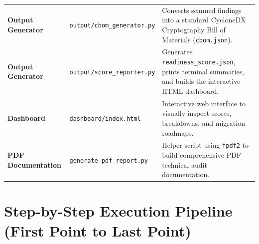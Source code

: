 \documentclass[11pt,a4paper,landscape]{article}
\begin{document}
{\begin{tabularx}{\linewidth}{l l X}
\textbf{Output Generator} & \texttt{output/cbom_generator.py} & Converts scanned findings into a standard CycloneDX Cryptography Bill of Materials (\texttt{cbom.json}). \\
\textbf{Output Generator} & \texttt{output/score_reporter.py} & Generates \texttt{readiness\_score.json}, prints terminal summaries, and builds the interactive HTML dashboard. \\
\textbf{Dashboard} & \texttt{dashboard/index.html} & Interactive web interface to visually inspect scores, breakdowns, and migration roadmaps. \\
\textbf{PDF Documentation} & \texttt{generate\_pdf\_report.py} & Helper script using \texttt{fpdf2} to build comprehensive PDF technical audit documentation. \\
\bottomrule
\end{tabularx}
}

\newpage

\section{Step-by-Step Execution Pipeline (First Point to Last Point)}
\end{document}
